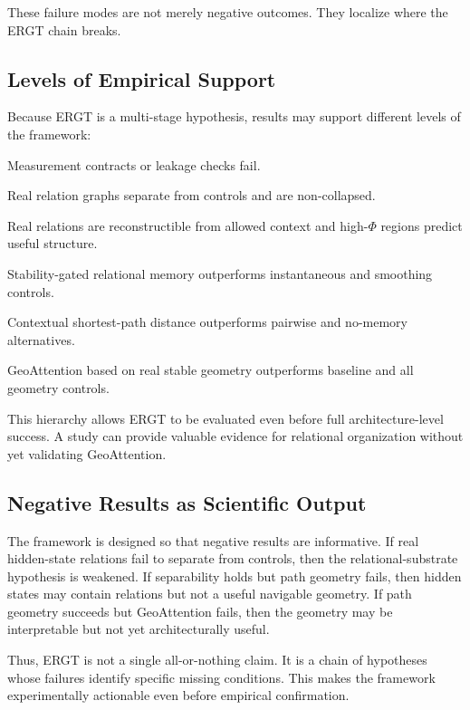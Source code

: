 \documentclass[11pt]{article}
\begin{document}
These failure modes are not merely negative outcomes. They localize where the ERGT chain breaks.

\subsection{Levels of Empirical Support}

Because ERGT is a multi-stage hypothesis, results may support different levels of the framework:
\begin{description}[leftmargin=2.8em, style=nextline]
    \item[Level 0: Invalid evaluation.] Measurement contracts or leakage checks fail.
    \item[Level 1: Relational evidence.] Real relation graphs separate from controls and are non-collapsed.
    \item[Level 2: Contextual evidence.] Real relations are reconstructible from allowed context and high-$\Phi$ regions predict useful structure.
    \item[Level 3: Memory evidence.] Stability-gated relational memory outperforms instantaneous and smoothing controls.
    \item[Level 4: Geometric evidence.] Contextual shortest-path distance outperforms pairwise and no-memory alternatives.
    \item[Level 5: Interventional evidence.] GeoAttention based on real stable geometry outperforms baseline and all geometry controls.
\end{description}

This hierarchy allows ERGT to be evaluated even before full architecture-level success. A study can provide valuable evidence for relational organization without yet validating GeoAttention.

\subsection{Negative Results as Scientific Output}

The framework is designed so that negative results are informative. If real hidden-state relations fail to separate from controls, then the relational-substrate hypothesis is weakened. If separability holds but path geometry fails, then hidden states may contain relations but not a useful navigable geometry. If path geometry succeeds but GeoAttention fails, then the geometry may be interpretable but not yet architecturally useful.

Thus, ERGT is not a single all-or-nothing claim. It is a chain of hypotheses whose failures identify specific missing conditions. This makes the framework experimentally actionable even before empirical confirmation.
\end{document}
